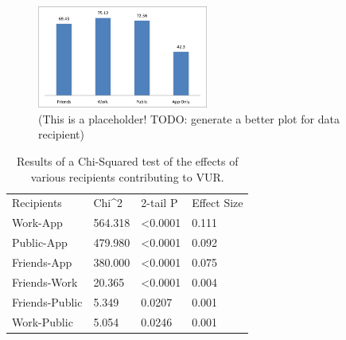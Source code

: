 \documentclass{acm_proc_article-sp}
\begin{document}
\begin{figure}
	\centering
	\includegraphics[width=0.5\textwidth]{recipient.png}
	\caption{(This is a placeholder! TODO: generate a better plot for data recipient)}
\end{figure}


\begin{table}%
\begin{center}
\begin{tabular}{llll}
Recipients	& Chi^2 &	2-tail P &  Effect Size \\
Work-App	& 564.318 & <0.0001 & 0.111\\
Public-App	& 479.980 & <0.0001 &  0.092\\
Friends-App & 380.000 & <0.0001 & 0.075\\
Friends-Work & 20.365 & <0.0001 &  0.004\\
Friends-Public & 5.349 & 0.0207 &  0.001\\
Work-Public&  5.054 & 0.0246 &  0.001\\
\end{tabular}
\caption{Results of a Chi-Squared test of the effects of various recipients contributing to VUR.}
\label{recipient}
\end{center}
\end{table}				
						
\end{document}
